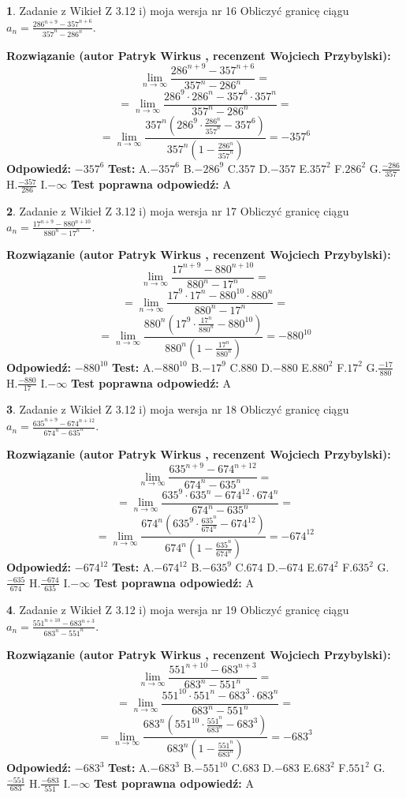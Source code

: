 \documentclass[12pt, a4paper]{article}
\theoremstyle{definition} %
\newtheorem{zad}{}
\newcommand{\zadStart}[1]{\begin{zad}#1\newline}
\newcommand{\zadStop}{\end{zad}}
\newcommand{\rozwStart}[2]{\noindent \textbf{Rozwiązanie (autor #1 , recenzent #2): }\newline}
\newcommand{\rozwStop}{\newline}
\newcommand{\odpStart}{\noindent \textbf{Odpowiedź:}\newline}
\newcommand{\odpStop}{\newline}
\newcommand{\testStart}{\noindent \textbf{Test:}\newline}
\newcommand{\testStop}{\newline}
\newcommand{\kluczStart}{\noindent \textbf{Test poprawna odpowiedź:}\newline}
\newcommand{\kluczStop}{\newline}
\begin{document}
\zadStart{Zadanie z Wikieł Z 3.12 i) moja wersja nr 16}
Obliczyć granicę ciągu $a_{n}=\frac{286^{n+9} - 357^{n+6}}{357^{n}-286^{n}}$.
\zadStop
\rozwStart{Patryk Wirkus}{Wojciech Przybylski}
$$\lim\limits_{n\to\infty}\frac{286^{n+9} - 357^{n+6}}{357^{n}-286^{n}}=$$
$$= \lim\limits_{n\to\infty}\frac{286^{9} \cdot 286^{n} - 357^{6} \cdot 357^{n}}{357^{n}-286^{n}}=$$
$$= \lim\limits_{n\to\infty}\frac{357^{n}(286^{9} \cdot \frac{286^{n}}{357^{n}} - 357^{6})}{357^{n}(1-\frac{286^{n}}{357^{n}})} = -357^{6}$$
\rozwStop
\odpStart
$-357^{6}$
\odpStop
\testStart
A.$-357^{6}$
B.$-286^{9}$
C.$357$
D.$-357$
E.$357^{2}$
F.$286^{2}$
G.$\frac{-286}{357}$
H.$\frac{-357}{286}$
I.$-\infty$
\testStop
\kluczStart
A
\kluczStop



\zadStart{Zadanie z Wikieł Z 3.12 i) moja wersja nr 17}
Obliczyć granicę ciągu $a_{n}=\frac{17^{n+9} - 880^{n+10}}{880^{n}-17^{n}}$.
\zadStop
\rozwStart{Patryk Wirkus}{Wojciech Przybylski}
$$\lim\limits_{n\to\infty}\frac{17^{n+9} - 880^{n+10}}{880^{n}-17^{n}}=$$
$$= \lim\limits_{n\to\infty}\frac{17^{9} \cdot 17^{n} - 880^{10} \cdot 880^{n}}{880^{n}-17^{n}}=$$
$$= \lim\limits_{n\to\infty}\frac{880^{n}(17^{9} \cdot \frac{17^{n}}{880^{n}} - 880^{10})}{880^{n}(1-\frac{17^{n}}{880^{n}})} = -880^{10}$$
\rozwStop
\odpStart
$-880^{10}$
\odpStop
\testStart
A.$-880^{10}$
B.$-17^{9}$
C.$880$
D.$-880$
E.$880^{2}$
F.$17^{2}$
G.$\frac{-17}{880}$
H.$\frac{-880}{17}$
I.$-\infty$
\testStop
\kluczStart
A
\kluczStop



\zadStart{Zadanie z Wikieł Z 3.12 i) moja wersja nr 18}
Obliczyć granicę ciągu $a_{n}=\frac{635^{n+9} - 674^{n+12}}{674^{n}-635^{n}}$.
\zadStop
\rozwStart{Patryk Wirkus}{Wojciech Przybylski}
$$\lim\limits_{n\to\infty}\frac{635^{n+9} - 674^{n+12}}{674^{n}-635^{n}}=$$
$$= \lim\limits_{n\to\infty}\frac{635^{9} \cdot 635^{n} - 674^{12} \cdot 674^{n}}{674^{n}-635^{n}}=$$
$$= \lim\limits_{n\to\infty}\frac{674^{n}(635^{9} \cdot \frac{635^{n}}{674^{n}} - 674^{12})}{674^{n}(1-\frac{635^{n}}{674^{n}})} = -674^{12}$$
\rozwStop
\odpStart
$-674^{12}$
\odpStop
\testStart
A.$-674^{12}$
B.$-635^{9}$
C.$674$
D.$-674$
E.$674^{2}$
F.$635^{2}$
G.$\frac{-635}{674}$
H.$\frac{-674}{635}$
I.$-\infty$
\testStop
\kluczStart
A
\kluczStop



\zadStart{Zadanie z Wikieł Z 3.12 i) moja wersja nr 19}
Obliczyć granicę ciągu $a_{n}=\frac{551^{n+10} - 683^{n+3}}{683^{n}-551^{n}}$.
\zadStop
\rozwStart{Patryk Wirkus}{Wojciech Przybylski}
$$\lim\limits_{n\to\infty}\frac{551^{n+10} - 683^{n+3}}{683^{n}-551^{n}}=$$
$$= \lim\limits_{n\to\infty}\frac{551^{10} \cdot 551^{n} - 683^{3} \cdot 683^{n}}{683^{n}-551^{n}}=$$
$$= \lim\limits_{n\to\infty}\frac{683^{n}(551^{10} \cdot \frac{551^{n}}{683^{n}} - 683^{3})}{683^{n}(1-\frac{551^{n}}{683^{n}})} = -683^{3}$$
\rozwStop
\odpStart
$-683^{3}$
\odpStop
\testStart
A.$-683^{3}$
B.$-551^{10}$
C.$683$
D.$-683$
E.$683^{2}$
F.$551^{2}$
G.$\frac{-551}{683}$
H.$\frac{-683}{551}$
I.$-\infty$
\testStop
\kluczStart
A
\kluczStop
\end{document}
